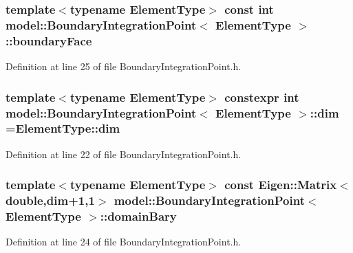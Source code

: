 \subsubsection[{boundary\+Face}]{\setlength{\rightskip}{0pt plus 5cm}template$<$typename Element\+Type$>$ const int {\bf model\+::\+Boundary\+Integration\+Point}$<$ Element\+Type $>$\+::boundary\+Face}\label{structmodel_1_1_boundary_integration_point_a402b5a2d6ab864ade19f1b4f8444b99b}


Definition at line 25 of file Boundary\+Integration\+Point.\+h.

\hypertarget{structmodel_1_1_boundary_integration_point_a1b53c04d801597636f2cb74742916ca5}{}
\subsubsection[{dim}]{\setlength{\rightskip}{0pt plus 5cm}template$<$typename Element\+Type$>$ constexpr int {\bf model\+::\+Boundary\+Integration\+Point}$<$ Element\+Type $>$\+::dim =Element\+Type\+::dim\hspace{0.3cm}{\ttfamily [static]}}\label{structmodel_1_1_boundary_integration_point_a1b53c04d801597636f2cb74742916ca5}


Definition at line 22 of file Boundary\+Integration\+Point.\+h.

\hypertarget{structmodel_1_1_boundary_integration_point_a35216a18938e489d23f419d391860829}{}
\subsubsection[{domain\+Bary}]{\setlength{\rightskip}{0pt plus 5cm}template$<$typename Element\+Type$>$ const Eigen\+::\+Matrix$<$double,{\bf dim}+1,1$>$ {\bf model\+::\+Boundary\+Integration\+Point}$<$ Element\+Type $>$\+::domain\+Bary}\label{structmodel_1_1_boundary_integration_point_a35216a18938e489d23f419d391860829}


Definition at line 24 of file Boundary\+Integration\+Point.\+h.

\hypertarget{structmodel_1_1_boundary_integration_point_a69c5801f95a18a2c3c9bc21bff580a56}{}
